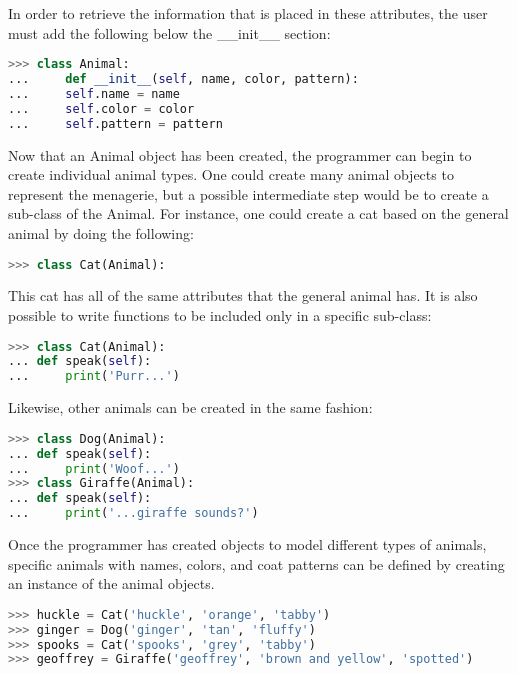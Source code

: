 In order to retrieve the information that is placed in these attributes, the user must add the following below the \_\_init\_\_ section:

\singlespace
\begin{lstlisting}[language=Python, caption=Defining attributes in classes]
>>> class Animal:
... 	def __init__(self, name, color, pattern):
...		self.name = name
...		self.color = color
...		self.pattern = pattern
\end{lstlisting}
\doublespace

Now that an Animal object has been created, the programmer can begin to create individual animal types. One could create many animal objects to represent the menagerie, but a possible intermediate step would be to create a sub-class of the Animal. For instance, one could create a cat based on the general animal by doing the following:

\singlespace
\begin{lstlisting}[language=Python, caption=Creating a subclass]
>>> class Cat(Animal):
\end{lstlisting}
\doublespace

This cat has all of the same attributes that the general animal has. It is also possible to write functions to be included only in a specific sub-class:

\singlespace
\begin{lstlisting}[language=Python, caption=Adding methods to a subclass]
>>> class Cat(Animal):
...	def speak(self):
...		print('Purr...')
\end{lstlisting}
\doublespace

Likewise, other animals can be created in the same fashion:

\singlespace
\begin{lstlisting}[language=Python, caption=Creating more subclasses]
>>> class Dog(Animal):
...	def speak(self):
...		print('Woof...')
>>> class Giraffe(Animal):
...	def speak(self):
...		print('...giraffe sounds?')
\end{lstlisting}
\doublespace

Once the programmer has created objects to model different types of animals, specific animals with names, colors, and coat patterns can be defined by creating an instance of the animal objects.

\singlespace
\begin{lstlisting}[language=Python, caption=Instantiating objects with attribute values]
>>> huckle = Cat('huckle', 'orange', 'tabby')
>>> ginger = Dog('ginger', 'tan', 'fluffy')
>>> spooks = Cat('spooks', 'grey', 'tabby')
>>> geoffrey = Giraffe('geoffrey', 'brown and yellow', 'spotted')
\end{lstlisting}
\doublespace

